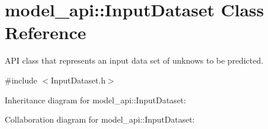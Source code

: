 \hypertarget{classmodel__api_1_1InputDataset}{}\section{model\+\_\+api\+:\+:Input\+Dataset Class Reference}
\label{classmodel__api_1_1InputDataset}


A\+PI class that represents an input data set of unknows to be predicted.  




{\ttfamily \#include $<$Input\+Dataset.\+h$>$}



Inheritance diagram for model\+\_\+api\+:\+:Input\+Dataset\+:


Collaboration diagram for model\+\_\+api\+:\+:Input\+Dataset\+:
